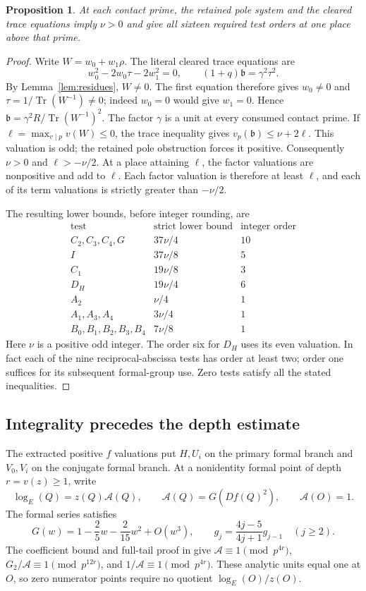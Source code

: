 \documentclass[11pt,a4paper]{article}
\newtheorem{proposition}[theorem]{Proposition}
\DeclareMathOperator{\Tr}{Tr}\DeclareMathOperator{\Nm}{Nm}
\begin{document}
\begin{proposition}\label{prop:extract}
At each contact prime, the retained pole system and the cleared trace
equations imply $\nu>0$ and give all sixteen required test orders at
one place above that prime.
\end{proposition}
\begin{proof}
Write $W=w_0+w_1\rho$. The literal cleared trace equations are
\[
 w_0^2-2w_0\tau-2w_1^2=0,\qquad (1+q)\mathfrak b=\gamma^2\tau^2.
\]
By Lemma~\ref{lem:residues}, $W\ne0$. The first equation therefore
gives $w_0\ne0$ and $\tau=1/\Tr(W^{-1})\ne0$; indeed $w_0=0$
would give $w_1=0$. Hence
$\mathfrak b=\gamma^2R/\Tr(W^{-1})^2$. The factor $\gamma$ is a unit at every consumed contact prime. If
$\ell=\max_{v\mid p}v(W)\le0$, the trace inequality gives
$v_p(\mathfrak b)\le\nu+2\ell$.
This valuation is odd; the retained pole obstruction forces it positive.
Consequently $\nu>0$ and $\ell>-\nu/2$.
At a place attaining $\ell$, the factor valuations are nonpositive
and add to $\ell$. Each factor valuation is therefore at least $\ell$,
and each of its term valuations is strictly greater than $-\nu/2$.

The resulting lower bounds, before integer rounding, are
\[
\begin{array}{c|c|c}
\text{test}&\text{strict lower bound}&\text{integer order}\\\hline
C_2,C_3,C_4,G&37\nu/4&10\\
I&37\nu/8&5\\
C_1&19\nu/8&3\\
D_H&19\nu/4&6\\
A_2&\nu/4&1\\
A_1,A_3,A_4&3\nu/4&1\\
B_0,B_1,B_2,B_3,B_4&7\nu/8&1
\end{array}
\]
Here $\nu$ is a positive odd integer. The order six for $D_H$ uses
its even valuation. In fact each of the nine reciprocal-abscissa
tests has order at least two; order one suffices for its subsequent
formal-group use. Zero tests satisfy all the stated inequalities.
\end{proof}

\subsection{Integrality precedes the depth estimate}
The extracted positive $f$ valuations put $H,U_i$ on the primary
formal branch and $V_0,V_i$ on the conjugate formal branch.
At a nonidentity formal point of depth $r=v(z)\ge1$, write
\[
 \log_E(Q)=z(Q)\mathcal A(Q),\qquad
 \mathcal A(Q)=G(Df(Q)^2),\qquad \mathcal A(O)=1.
\]
The formal series satisfies
\[
 G(w)=1-\frac25w-\frac2{15}w^2+O(w^3),\qquad
 g_j=\frac{4j-5}{4j+1}g_{j-1}\quad(j\ge2).
\]
The coefficient bound and full-tail proof in \cite[Lemma 3.1]{Even}
give $\mathcal A\equiv1\pmod{p^{4r}}$,
$G_2/\mathcal A\equiv1\pmod{p^{12r}}$, and
$1/\mathcal A\equiv1\pmod{p^{4r}}$.
These analytic units equal one at $O$, so zero numerator points
require no quotient $\log_E(O)/z(O)$.
\end{document}
